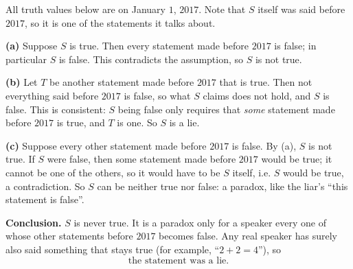 All truth values below are on January $1$, $2017$. Note that $S$ itself was said before $2017$, so it is one of the statements it talks about.

\textbf{(a)} Suppose $S$ is true. Then every statement made before $2017$ is false; in particular $S$ is false. This contradicts the assumption, so $S$ is not true.

\textbf{(b)} Let $T$ be another statement made before $2017$ that is true. Then not everything said before $2017$ is false, so what $S$ claims does not hold, and $S$ is false. This is consistent: $S$ being false only requires that \emph{some} statement made before $2017$ is true, and $T$ is one. So $S$ is a lie.

\textbf{(c)} Suppose every other statement made before $2017$ is false. By (a), $S$ is not true. If $S$ were false, then some statement made before $2017$ would be true; it cannot be one of the others, so it would have to be $S$ itself, i.e. $S$ would be true, a contradiction. So $S$ can be neither true nor false: a paradox, like the liar's ``this statement is false''.

\textbf{Conclusion.} $S$ is never true. It is a paradox only for a speaker every one of whose other statements before $2017$ becomes false. Any real speaker has surely also said something that stays true (for example, ``$2+2=4$''), so
\[\boxed{\text{the statement was a lie.}}\]
